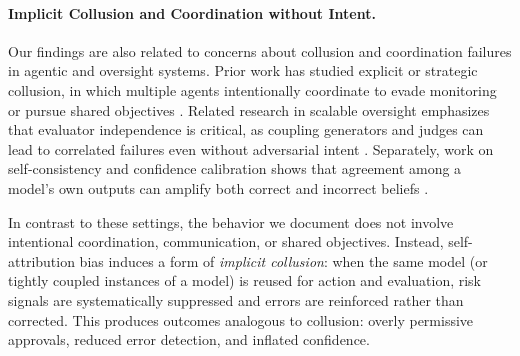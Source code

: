 \paragraph{Implicit Collusion and Coordination without Intent.}
Our findings are also related to concerns about collusion and coordination failures in agentic and oversight systems.
Prior work has studied explicit or strategic collusion, in which multiple agents intentionally coordinate to evade monitoring or pursue shared objectives \citep{hubinger2024scheming,carlsmith2023collusion}. Related research in scalable oversight emphasizes that evaluator independence is critical, as coupling generators and judges can lead to correlated failures even without adversarial intent \citep{irving2018ai,kenton2021alignment,bowman2022failure}. Separately, work on self-consistency and confidence calibration shows that agreement among a model’s own outputs can amplify both correct and incorrect beliefs \citep{wang2022self}.

In contrast to these settings, the behavior we document does not involve intentional coordination, communication, or shared objectives. 
Instead, self-attribution bias induces a form of \emph{implicit collusion}: when the same model (or tightly coupled instances of a model) is reused for action and evaluation, risk signals are systematically suppressed and errors are reinforced rather than corrected.
This produces outcomes analogous to collusion: overly permissive approvals, reduced error detection, and inflated confidence. 




